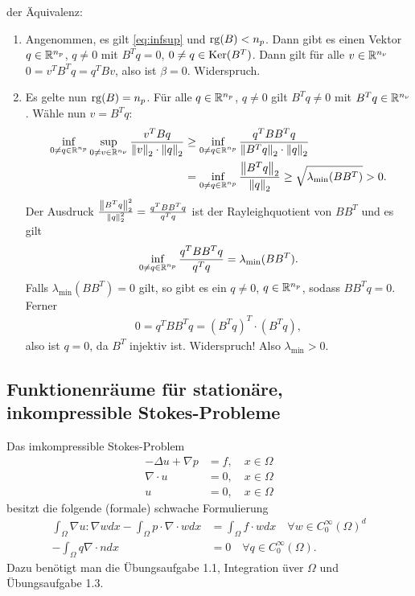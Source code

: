\begin{beweis}der Äquivalenz:

  \begin{enumerate}
  \item Angenommen, es gilt \eqref{eq:infsup} und $\operatorname{rg}(B) < n_{p}$. Dann gibt es einen Vektor $q \in \mathbb{R}^{n_{p}}$, $q \neq 0$ mit $B^{T}q = 0$, $0 \neq q \in \operatorname{Ker}(B^{T})$. Dann gilt für alle $v \in \mathbb{R}^{n_{\nu}}$ $ 0= v^{T}B^{T}q = q^{T}Bv$, also ist $\beta = 0$. Widerspruch. 
\item Es gelte nun $\operatorname{rg}(B) = n_{p}$. Für alle $q \in \mathbb{R}^{n_{p}}$, $q \neq 0$ gilt $B^{T}q \neq 0$ mit $B^{T}q \in \mathbb{R}^{n_{\nu}}$. Wähle nun $v = B^{T}q$:
  \begin{align*}
    \inf_{0 \neq q \in \mathbb{R}^{n_{p}}} \sup_{ 0 \neq v \in \mathbb{R}^{n_{\nu}}} \frac {v^{T}Bq}{\left \|v \right\|_{2} \cdot \left \|q \right\|_{2}}&\geq \inf_{0 \neq q \in \mathbb{R}^{n_{p}}} \frac {q^{T}BB^{T}q}{\left \|B^{T}q \right\|_{2} \cdot \left \|q \right\|_{2}}\\
&= \inf_{0 \neq q \in \mathbb{R}^{n_{p}}} \frac {\left \|B^{T}q \right\|_{2}}{\left \|q \right\|_{2}} \geq \sqrt{\lambda_{\min}(BB^{T})} > 0.
  \end{align*}
Der Ausdruck $\frac {\left \|B^{T}q \right\|^{2}_{2}}{\left \|q \right\|^{2}_{2}} = \frac{q^{T}BB^{T}q}{q^{T}q}$ ist der Rayleighquotient von $BB^{T}$ und es gilt
\begin{align*}
  \inf_{0 \neq q \in \mathbb{R}^{n_{p}}} \frac {q^{T}BB^{T}q}{q^{T}q} = \lambda_{\min}(BB^{T}).
\end{align*}
Falls $\lambda_{\min}(BB^{T}) = 0$ gilt, so gibt es ein $q \neq 0$, $q \in \mathbb{R}^{n_{p}}$, sodass $BB^{T}q = 0$. Ferner
\begin{align*}
  0 = q^{T}BB^{T}q = (B^{T}q)^{T}\cdot(B^{T}q), 
\end{align*}
also ist $q = 0$, da $B^{T}$ injektiv ist. Widerspruch! Also $\lambda_{\min}> 0$. 
  \end{enumerate}  
\end{beweis}

\subsection{Funktionenräume für stationäre, inkompressible Stokes-Probleme }
\label{sec:funkt-fur-stat}

Das imkompressible Stokes-Problem
\begin{align}\label{eq:stokes}
  - \Delta u + \nabla p & = f, \quad x \in \Omega\\
\nabla \cdot u  &= 0, \quad x \in \Omega\\
u &= 0, \quad x \in \Omega
\end{align}
besitzt die folgende (formale) schwache Formulierung
\begin{align}\label{eq:stokes_weak}
  \int_{\Omega} \nabla u : \nabla w dx - \int_{\Omega} p \cdot \nabla \cdot w dx &= \int_{\Omega} f \cdot w dx \quad \forall w \in C_{0}^{\infty}(\Omega)^{d}\\
- \int_{\Omega} q \nabla\cdot n dx& = 0\quad \forall q \in C_{0}^{\infty}(\Omega).
\end{align}
Dazu benötigt man die Übungsaufgabe 1.1, Integration üver $\Omega$ und Übungsaufgabe 1.3.

